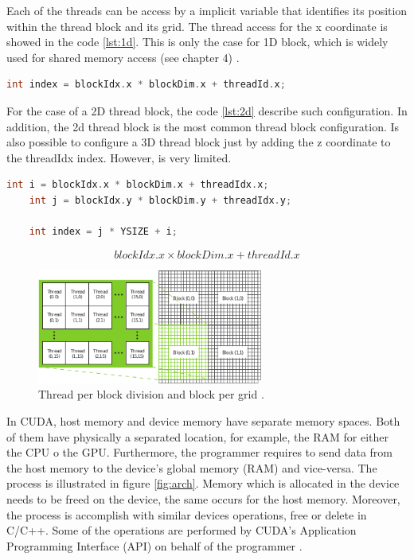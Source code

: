 Each of the threads can be access by a implicit variable that identifies its position within the thread block and its grid. The thread access for the x coordinate is showed in the code \ref{lst:1d}. This is only the case for 1D block, which is widely used for shared memory access (see chapter 4) \cite{example}.

\begin{lstlisting}[language=C++, label={lst:1d}, caption={1D thread block operation on a CUDA kernel}]	
	int index = blockIdx.x * blockDim.x + threadId.x;
\end{lstlisting}

For the case of a 2D thread block, the code \ref{lst:2d} describe such configuration. In addition, the 2d thread block is the most common thread block configuration. Is also possible to configure a 3D thread block just by adding the z coordinate to the threadIdx index. However, is very limited.

\begin{lstlisting}[language=C++, label={lst:2d}, caption={2D thread block operation on a CUDA kernel}]	
    int i = blockIdx.x * blockDim.x + threadIdx.x;
    int j = blockIdx.y * blockDim.y + threadIdx.y;
    
    int index = j * YSIZE + i;
\end{lstlisting}

$$blockIdx.x \times blockDim.x + threadId.x$$

\begin{figure}[htbp]
	\centering
		\includegraphics[width=0.66\textwidth]{Figures/grid.png}
		\smallskip
	\caption[CUDA's 2D thread grid]{Thread per block division and block per grid \cite{hwu}.}
	\label{fig:grid}
\end{figure}

In CUDA, host memory and device memory have separate memory spaces. Both of them have physically a separated location, for example, the RAM for either the CPU o the GPU. Furthermore, the programmer requires to send data from the host memory to the device's global memory (RAM) and vice-versa. The process is illustrated in figure \ref{fig:arch}. Memory which is allocated in the device needs to be freed on the device, the same occurs for the host memory. Moreover, the process is accomplish with similar devices operations, free or delete in C/C++. Some of the operations are performed by CUDA's Application Programming Interface (API) on behalf of the programmer \cite{hwu}.

